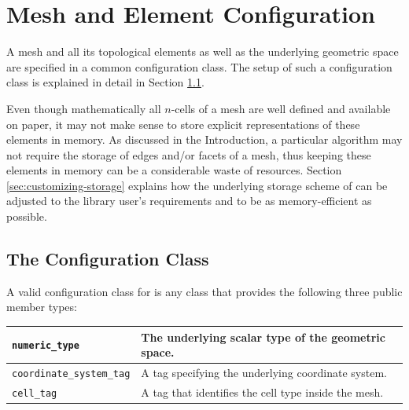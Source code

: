 \chapter{Mesh and Element Configuration} \label{chap:meshconfig}

 

A mesh and all its topological elements as well as the underlying geometric space are specified in a common configuration class.
The setup of such a configuration class is explained in detail in Section \ref{sec:config-class}.

Even though mathematically all $n$-cells of a mesh are well defined and available on paper, it may not make sense to store explicit representations of these elements in memory.
As discussed in the Introduction, a particular algorithm may not require the storage of edges and/or facets of a mesh, thus keeping these elements in memory can be a considerable waste of resources.
Section \ref{sec:customizing-storage} explains how the underlying storage scheme of {\ViennaGrid} can be adjusted to the library user's requirements and to be as memory-efficient as possible.


\section{The Configuration Class} \label{sec:config-class}
A valid configuration class for {\ViennaGrid} is any class that provides the following three public member types:
\begin{center}
\begin{tabular}{|l|p{8cm}|}
\hline
 \lstinline|numeric_type|   & The underlying scalar type of the geometric space. \\
\hline
 \lstinline|coordinate_system_tag| & A tag specifying the underlying coordinate system.\\
\hline
 \lstinline|cell_tag|       & A tag that identifies the cell type inside the mesh.\\
\hline
\end{tabular}
\end{center}

